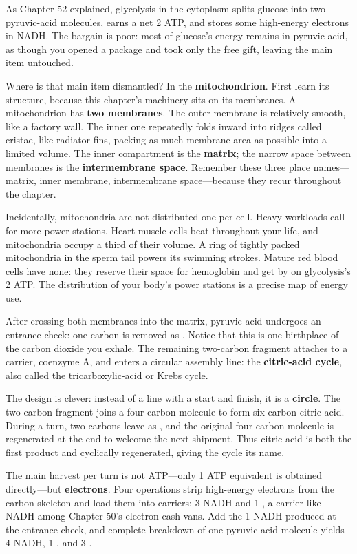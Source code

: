 As Chapter 52 explained, glycolysis in the cytoplasm splits glucose into two pyruvic-acid molecules, earns a net 2 ATP, and stores some high-energy electrons in NADH. The bargain is poor: most of glucose's energy remains in pyruvic acid, as though you opened a package and took only the free gift, leaving the main item untouched.

Where is that main item dismantled? In the \textbf{mitochondrion}. First learn its structure, because this chapter's machinery sits on its membranes. A mitochondrion has \textbf{two membranes}. The outer membrane is relatively smooth, like a factory wall. The inner one repeatedly folds inward into ridges called cristae, like radiator fins, packing as much membrane area as possible into a limited volume. The inner compartment is the \textbf{matrix}; the narrow space between membranes is the \textbf{intermembrane space}. Remember these three place names---matrix, inner membrane, intermembrane space---because they recur throughout the chapter.

Incidentally, mitochondria are not distributed one per cell. Heavy workloads call for more power stations. Heart-muscle cells beat throughout your life, and mitochondria occupy a third of their volume. A ring of tightly packed mitochondria in the sperm tail powers its swimming strokes. Mature red blood cells have none: they reserve their space for hemoglobin and get by on glycolysis's 2 ATP. The distribution of your body's power stations is a precise map of energy use.

After crossing both membranes into the matrix, pyruvic acid undergoes an entrance check: one carbon is removed as . Notice that this is one birthplace of the carbon dioxide you exhale. The remaining two-carbon fragment attaches to a carrier, coenzyme A, and enters a circular assembly line: the \textbf{citric-acid cycle}, also called the tricarboxylic-acid or Krebs cycle.

The design is clever: instead of a line with a start and finish, it is a \textbf{circle}. The two-carbon fragment joins a four-carbon molecule to form six-carbon citric acid. During a turn, two carbons leave as , and the original four-carbon molecule is regenerated at the end to welcome the next shipment. Thus citric acid is both the first product and cyclically regenerated, giving the cycle its name.

The main harvest per turn is not ATP---only 1 ATP equivalent is obtained directly---but \textbf{electrons}. Four operations strip high-energy electrons from the carbon skeleton and load them into carriers: 3 NADH and 1 , a carrier like NADH among Chapter 50's electron cash vans. Add the 1 NADH produced at the entrance check, and complete breakdown of one pyruvic-acid molecule yields 4 NADH, 1 , and 3 .


